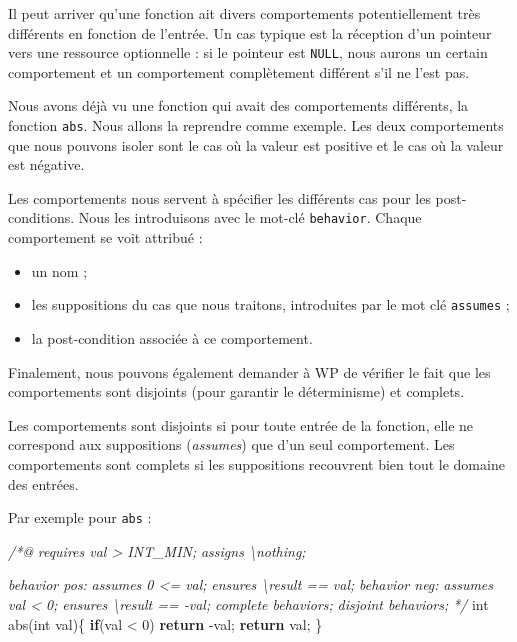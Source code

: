 \documentclass[12pt,francais,]{scrbook}
\newenvironment{Shaded}{}{}
\newcommand{\KeywordTok}[1]{\textcolor[rgb]{0.00,0.44,0.13}{\textbf{{#1}}}}
\newcommand{\DataTypeTok}[1]{\textcolor[rgb]{0.56,0.13,0.00}{{#1}}}
\newcommand{\DecValTok}[1]{\textcolor[rgb]{0.25,0.63,0.44}{{#1}}}
\newcommand{\CommentTok}[1]{\textcolor[rgb]{0.38,0.63,0.69}{\textit{{#1}}}}
\newcommand{\NormalTok}[1]{{#1}}
\providecommand{\tightlist}{%
  \setlength{\itemsep}{0pt}\setlength{\parskip}{0pt}}
\begin{document}
Il peut arriver qu'une fonction ait divers comportements potentiellement
très différents en fonction de l'entrée. Un cas typique est la réception
d'un pointeur vers une ressource optionnelle : si le pointeur est
\texttt{NULL}, nous aurons un certain comportement et un comportement
complètement différent s'il ne l'est pas.

Nous avons déjà vu une fonction qui avait des comportements différents,
la fonction \texttt{abs}. Nous allons la reprendre comme exemple. Les
deux comportements que nous pouvons isoler sont le cas où la valeur est
positive et le cas où la valeur est négative.

Les comportements nous servent à spécifier les différents cas pour les
post-conditions. Nous les introduisons avec le mot-clé
\texttt{behavior}. Chaque comportement se voit attribué :

\begin{itemize}
\tightlist
\item
  un nom ;
\item
  les suppositions du cas que nous traitons, introduites par le mot clé
  \texttt{assumes} ;
\item
  la post-condition associée à ce comportement.
\end{itemize}

Finalement, nous pouvons également demander à WP de vérifier le fait que
les comportements sont disjoints (pour garantir le déterminisme) et
complets.

Les comportements sont disjoints si pour toute entrée de la fonction,
elle ne correspond aux suppositions (\emph{assumes}) que d'un seul
comportement. Les comportements sont complets si les suppositions
recouvrent bien tout le domaine des entrées.



Par exemple pour \texttt{abs} :

\begin{footnotesize}\begin{Shaded}
\begin{Highlighting}[]
\CommentTok{/*@}
\CommentTok{  requires val > INT_MIN;}
\CommentTok{  assigns  \textbackslash{}nothing;}

\CommentTok{  behavior pos:}
\CommentTok{    assumes 0 <= val;}
\CommentTok{    ensures \textbackslash{}result == val;}
\CommentTok{  }
\CommentTok{  behavior neg:}
\CommentTok{    assumes val < 0;}
\CommentTok{    ensures \textbackslash{}result == -val;}
\CommentTok{ }
\CommentTok{  complete behaviors;}
\CommentTok{  disjoint behaviors;}
\CommentTok{*/}
\DataTypeTok{int} \NormalTok{abs(}\DataTypeTok{int} \NormalTok{val)\{}
  \KeywordTok{if}\NormalTok{(val < }\DecValTok{0}\NormalTok{) }\KeywordTok{return} \NormalTok{-val;}
  \KeywordTok{return} \NormalTok{val;}
\NormalTok{\}}
\end{Highlighting}
\end{Shaded}\end{footnotesize}
\end{document}

